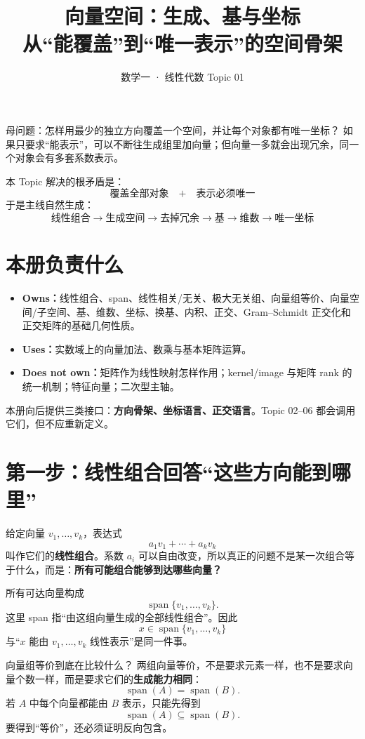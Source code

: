 \documentclass[11pt,a4paper]{ctexart}
\title{\vspace{-1.1cm}\textbf{向量空间：生成、基与坐标}\\[0.4em]
\large 从“能覆盖”到“唯一表示”的空间骨架}
\author{数学一 · 线性代数 Topic 01}
\date{}
\newcommand{\kw}[1]{\textbf{\color{deep}#1}}
\begin{document}
\maketitle

\begin{corebox}{母问题：怎样用最少的独立方向覆盖一个空间，并让每个对象都有唯一坐标？}
如果只要求“能表示”，可以不断往生成组里加向量；但向量一多就会出现冗余，同一个对象会有多套系数表示。

本 Topic 解决的根矛盾是：
\[
\boxed{\text{覆盖全部对象}\quad +\quad \text{表示必须唯一}}
\]
于是主线自然生成：
\[
\boxed{
\text{线性组合}
\to \text{生成空间}
\to \text{去掉冗余}
\to \text{基}
\to \text{维数}
\to \text{唯一坐标}
}
\]
\end{corebox}

\section{本册负责什么}

\begin{itemize}
  \item \kw{Owns：}线性组合、span、线性相关/无关、极大无关组、向量组等价、向量空间/子空间、基、维数、坐标、换基、内积、正交、Gram--Schmidt 正交化和正交矩阵的基础几何性质。
  \item \kw{Uses：}实数域上的向量加法、数乘与基本矩阵运算。
  \item \kw{Does not own：}矩阵作为线性映射怎样作用；kernel/image 与矩阵 rank 的统一机制；特征向量；二次型主轴。
\end{itemize}

本册向后提供三类接口：\kw{方向骨架、坐标语言、正交语言}。Topic 02--06 都会调用它们，但不应重新定义。

\section{第一步：线性组合回答“这些方向能到哪里”}

给定向量 $v_1,\dots,v_k$，表达式
\[
a_1v_1+\cdots+a_kv_k
\]
叫作它们的\kw{线性组合}。系数 $a_i$ 可以自由改变，所以真正的问题不是某一次组合等于什么，而是：\kw{所有可能组合能够到达哪些向量？}

所有可达向量构成
\[
\operatorname{span}\{v_1,\dots,v_k\}.
\]
这里 span 指“由这组向量生成的全部线性组合”。因此
\[
x\in\operatorname{span}\{v_1,\dots,v_k\}
\]
与“$x$ 能由 $v_1,\dots,v_k$ 线性表示”是同一件事。

\begin{methodbox}{向量组等价到底在比较什么？}
两组向量等价，不是要求元素一样，也不是要求向量个数一样，而是要求它们的\kw{生成能力相同}：
\[
\operatorname{span}(A)=\operatorname{span}(B).
\]
若 $A$ 中每个向量都能由 $B$ 表示，只能先得到
\[
\operatorname{span}(A)\subseteq\operatorname{span}(B).
\]
要得到“等价”，还必须证明反向包含。
\end{methodbox}
\end{document}
